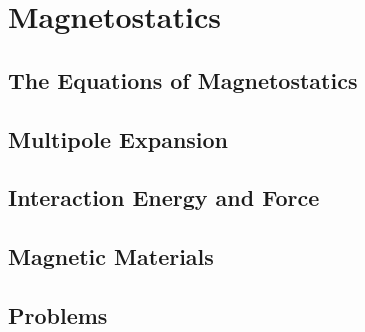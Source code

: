\setcounter{chapter}{0}
\renewcommand{\thechapter}{4}
\chapter{Magnetostatics}\label{ch:4}
\setcounter{equation}{0}	        %

\section{The Equations of Magnetostatics}

\section{Multipole Expansion}

\section{Interaction Energy and Force}

\section{Magnetic Materials}


\section*{Problems}


